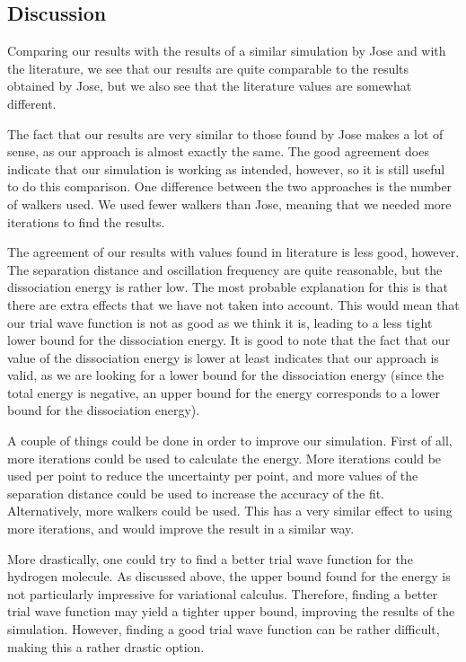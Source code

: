 \subsection{Discussion}
Comparing our results with the results of a similar simulation by Jose and with the literature, we see that our results are quite comparable to the results obtained by Jose, but we also see that the literature values are somewhat different. 

The fact that our results are very similar to those found by Jose makes a lot of sense, as our approach is almost exactly the same. The good agreement does indicate that our simulation is working as intended, however, so it is still useful to do this comparison. One difference between the two approaches is the number of walkers used. We used fewer walkers than Jose, meaning that we needed more iterations to find the results. 

The agreement of our results with values found in literature is less good, however. The separation distance and oscillation frequency are quite reasonable, but the dissociation energy is rather low. The most probable explanation for this is that there are extra effects that we have not taken into account. This would mean that our trial wave function is not as good as we think it is, leading to a less tight lower bound for the dissociation energy. It is good to note that the fact that our value of the dissociation energy is lower at least indicates that our approach is valid, as we are looking for a lower bound for the dissociation energy (since the total energy is negative, an upper bound for the energy corresponds to a lower bound for the dissociation energy).

A couple of things could be done in order to improve our simulation. First of all, more iterations could be used to calculate the energy. More iterations could be used per point to reduce the uncertainty per point, and more values of the separation distance could be used to increase the accuracy of the fit. Alternatively, more walkers could be used. This has a very similar effect to using more iterations, and would improve the result in a similar way.

More drastically, one could try to find a better trial wave function for the hydrogen molecule. As discussed above, the upper bound found for the energy is not particularly impressive for variational calculus. Therefore, finding a better trial wave function may yield a tighter upper bound, improving the results of the simulation. However, finding a good trial wave function can be rather difficult, making this a rather drastic option. 

